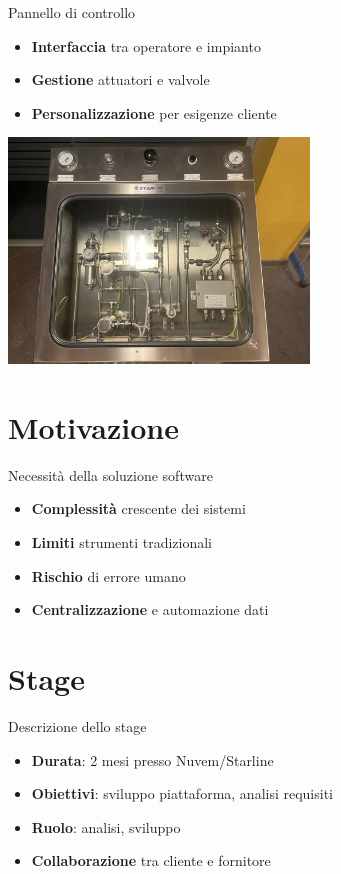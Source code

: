 \documentclass{beamer}
\begin{document}
\begin{frame}{Pannello di controllo}
    \begin{itemize}
        \item \textbf{Interfaccia} tra operatore e impianto
        \item \textbf{Gestione} attuatori e valvole
        \item \textbf{Personalizzazione} per esigenze cliente
    \end{itemize}
    \begin{center}
        \includegraphics[width=0.6\textwidth]{images/Contesto_Applicativo/pannello_controllo.jpg} %
    \end{center}
\end{frame}

\section{Motivazione}
\begin{frame}{Necessità della soluzione software}
    \begin{itemize}
        \item \textbf{Complessità} crescente dei sistemi
        \item \textbf{Limiti} strumenti tradizionali
        \item \textbf{Rischio} di errore umano
        \item \textbf{Centralizzazione} e automazione dati
    \end{itemize}
\end{frame}

\section{Stage}
\begin{frame}{Descrizione dello stage}
    \begin{itemize}
        \item \textbf{Durata}: 2 mesi presso Nuvem/Starline
        \item \textbf{Obiettivi}: sviluppo piattaforma, analisi requisiti
        \item \textbf{Ruolo}: analisi, sviluppo
        \item \textbf{Collaborazione} tra cliente e fornitore
    \end{itemize}
\end{frame}
\end{document}
